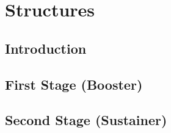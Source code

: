 \section{Structures}
\subsection{Introduction}
\subsection{First Stage (Booster)}
\subsection{Second Stage (Sustainer)}
